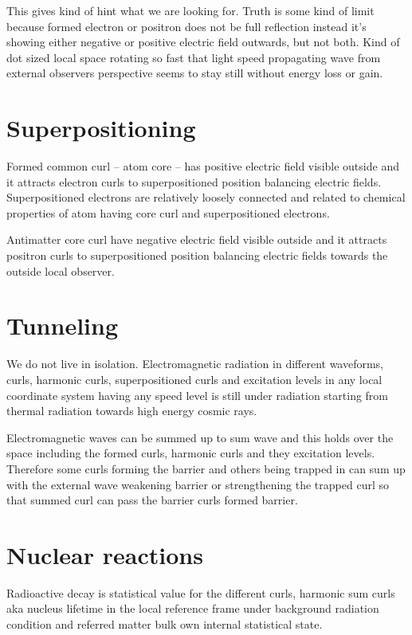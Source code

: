 This gives kind of hint what we are looking for. Truth is some kind of limit
because formed electron or positron does not be full reflection instead it's
showing either negative or positive electric field outwards, but not both.
Kind of dot sized local space rotating so fast that light speed propagating
wave from external observers perspective seems to stay still without energy
loss or gain.

\section{Superpositioning}
\label{superpositioning}

Formed common curl -- atom core -- has positive electric field visible outside
and it attracts electron curls to superpositioned position balancing electric
fields. Superpositioned electrons are relatively loosely connected and related
to chemical properties of atom having core curl and superpositioned electrons.

Antimatter core curl have negative electric field visible outside and it
attracts positron curls to superpositioned position balancing electric fields
towards the outside local observer.

\section{Tunneling}
\label{tunneling}

We do not live in isolation. Electromagnetic radiation in different waveforms,
curls, harmonic curls, superpositioned curls and excitation levels in any
local coordinate system having any speed level is still under radiation
starting from thermal radiation towards high energy cosmic rays.

Electromagnetic waves can be summed up to sum wave and this holds over the
space including the formed curls, harmonic curls and they excitation levels.
Therefore some curls forming the barrier and others being trapped in can sum
up with the external wave weakening barrier or strengthening the trapped curl
so that summed curl can pass the barrier curls formed barrier.

\section{Nuclear reactions}
\label{nuclear_reaction}

Radioactive decay is statistical value for the different curls, harmonic sum
curls aka nucleus lifetime in the local reference frame under background
radiation condition and referred matter bulk own internal statistical state.

